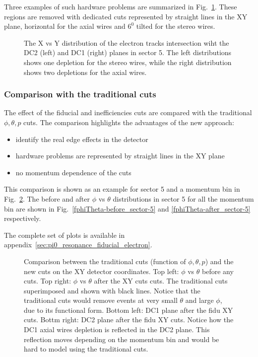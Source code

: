 Three examples of such hardware problems are summarized in Fig.~\ref{fig:xy_dc12_s5}.
These regions are removed with dedicated cuts represented by straight lines in the XY plane,
horizontal for the axial wires and $6^0$ tilted for the stereo wires.


\begin{figure}[ht]
    \centering
    \caption{The X vs Y distribution of the electron tracks intersection wiht the DC2 (left)
        and DC1 (right) planes in sector 5. The left distributions shows one depletion for the stereo wires,
        while the right distribution shows two depletions for the axial wires.}
    \label{fig:xy_dc12_s5}
\end{figure}

\subsubsection{Comparison with the traditional cuts}

The effect of the fiducial and inefficiencies cuts are compared with the traditional $\phi, \theta, p$ cuts.
The comparison highlights the advantages of the new approach:

\begin{itemize}
    \item identify the real edge effects in the detector
    \item hardware problems are represented by straight lines in the XY plane
    \item no momentum dependence of the cuts
\end{itemize}
This comparison is shown as an example for sector 5 and a momentum bin in Fig.~\ref{fig:PnPvsTmom-3.8_sector-5_plot-phiVsTheta}.
The before and after $\phi$ vs $\theta$ distributions in sector 5 for all the momentum bin are shown in Fig.~\ref{fphiTheta-before_sector-5}
and \ref{fphiTheta-after_sector-5} respectively.

The complete set of plots is available in appendix~\ref{sec:pi0_resonance_fiducial_electron}.

\begin{figure}[ht]
    \centering
    \caption{Comparison between the traditional cuts (function of $\phi, \theta, p$) and the new cuts on the XY detector coordinates.
    Top left:  $\phi$ vs $\theta$ before any cuts. Top right:  $\phi$ vs $\theta$ after the XY cuts cuts. The traditional cuts superimposed
    and shown with black lines. Notice that the traditional cuts would remove events at very small $\theta$ and large $\phi$, due to its functional form.
    Bottom left: DC1 plane after the fidu XY cuts. Bottm right: DC2 plane after the fidu XY cuts.
    Notice how the DC1 axial wires depletion is reflected in the DC2 plane. This reflection moves depending on the momentum bin and would be hard to model
    using the traditional cuts.}
    \label{fig:PnPvsTmom-3.8_sector-5_plot-phiVsTheta}
\end{figure}




